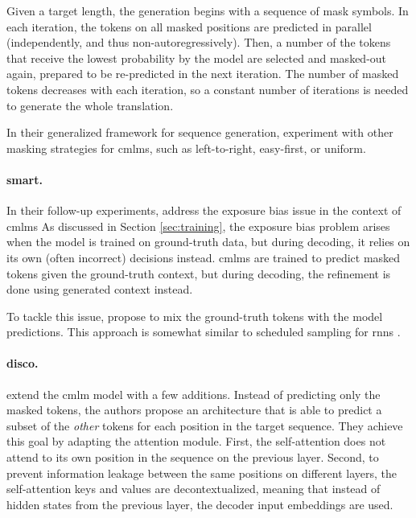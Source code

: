 Given a target length, the generation begins with a sequence of mask symbols.
In each iteration, the tokens on all masked positions are predicted in parallel
(independently, and thus non-autoregressively). Then, a number of the tokens
that receive the lowest probability by the model are selected and masked-out
again, prepared to be re-predicted in the next iteration. The number of masked
tokens decreases with each iteration, so a constant number of iterations is
needed to generate the whole translation.

In their generalized framework for sequence generation,
\citet{mansimov2019generalized} experiment with other masking strategies for
\acp{cmlm}, such as left-to-right, easy-first, or uniform.

\paragraph{\Acl{smart}.} In their follow-up experiments,
\citet{ghazvininejad-etal-2020-semiautoregressive} address the exposure bias
issue in the context of \acp{cmlm}
As discussed in Section \ref{sec:training}, the exposure bias problem arises
when the model is trained on ground-truth data, but during decoding, it relies
on its own (often incorrect) decisions instead. \Acp{cmlm} are trained to
predict masked tokens given the ground-truth context, but during decoding, the
refinement is done using generated context instead.

To tackle this issue, \citet{ghazvininejad-etal-2020-semiautoregressive}
propose to mix the ground-truth tokens with the model predictions. This
approach is somewhat similar to scheduled sampling for \aclp{rnn}
\citep{bengio2015scheduled}.

\paragraph{\Acl{disco}.} \citet{kasai2020nonautoregressive} extend the
\ac{cmlm} model with a few additions. Instead of predicting only the masked
tokens, the authors propose an architecture that is able to predict a subset of
the \emph{other} tokens for each position in the target sequence. They achieve
this goal by adapting the attention module. First, the self-attention does not
attend to its own position in the sequence on the previous layer. Second, to
prevent information leakage between the same positions on different layers, the
self-attention keys and values are decontextualized, meaning that instead of
hidden states from the previous layer, the decoder input embeddings are
used.


